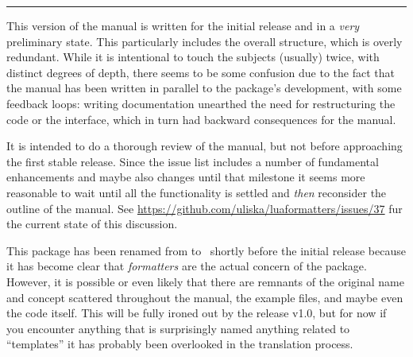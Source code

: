 \documentclass[12pt]{scrartcl}
\title{\luaformatters}
\subtitle{v0.8}
\author{Urs Liska}
\date{\today}
\begin{document}
\maketitle

\begin{abstract}

\luaformatters\ is a package for Lua\LaTeX\ designed to assist package
and document authors with the recurring task of \emph{templating}.  It
substantially reduces the complexity of interfacing the \LaTeX\ and the Lua
domains, making it simpler to approach the development of document preambles and
packages purely in Lua.  At the same time it assists with and encourages a
modular style of programming templates and styles.
\end{abstract}

\hrule

\bigskip

\noindent {} This version of the manual is written for the
initial release and in a \emph{very} preliminary state. This particularly
includes the overall structure, which is overly redundant. While it is
intentional to touch the subjects (usually) twice, with distinct degrees of
depth, there seems to be some confusion due to the fact that the manual has been
written in parallel to the package's development, with some feedback loops:
writing documentation unearthed the need for restructuring the code or the
interface, which in turn had backward consequences for the manual.

It is intended to do a thorough review of the manual, but not before approaching
the first stable release.  Since the issue list includes a number of fundamental
enhancements and maybe also changes until that milestone it seems more
reasonable to wait until all the functionality is settled and \emph{then}
reconsider the outline of the manual.  See
\url{https://github.com/uliska/luaformatters/issues/37} fur the current state of
this discussion.

\medskip

\noindent {} This package has been renamed from
 to \luaformatters\ shortly before the initial release
because it has become clear that \emph{formatters} are the actual concern of the
package.  However, it is possible or even likely that there are remnants of the
original name and concept scattered throughout the manual, the example files,
and maybe even the code itself.  This will be fully ironed out by the release
v1.0, but for now if you encounter anything that is surprisingly named anything
related to “templates” it has probably been overlooked in the translation
process.
\end{document}
